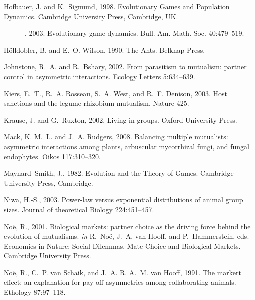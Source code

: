 \documentclass[a4paper]{scrartcl}
\begin{document}
\begin{thebibliography}{58}
Hofbauer, J. and K.~Sigmund, 1998.
\newblock Evolutionary Games and Population Dynamics.
\newblock Cambridge University Press, Cambridge, UK.

---{}---{}---, 2003.
\newblock Evolutionary game dynamics.
\newblock Bull. Am. Math. Soc. 40:479--519.

H{\"o}lldobler, B. and E.~O. Wilson, 1990.
\newblock The Ants.
\newblock Belknap Press.

Johnstone, R.~A. and R.~Bshary, 2002.
\newblock From parasitism to mutualism: partner control in asymmetric
  interactions.
\newblock Ecology Letters 5:634--639.

Kiers, E.~T., R.~A. Rosseau, S.~A. West, and R.~F. Denison, 2003.
\newblock Host sanctions and the legume-rhizobium mutualism.
\newblock Nature 425.

Krause, J. and G.~Ruxton, 2002.
\newblock Living in groups.
\newblock Oxford University Press.

Mack, K. M.~L. and J.~A. Rudgers, 2008.
\newblock Balancing multiple mutualists: asymmetric interactions among plants,
  arbuscular mycorrhizal fungi, and fungal endophytes.
\newblock Oikos 117:310--320.

Maynard~Smith, J., 1982.
\newblock Evolution and the Theory of Games.
\newblock Cambridge University Press, Cambridge.

Niwa, H.-S., 2003.
\newblock Power-law versus exponential distributions of animal group sizes.
\newblock Journal of theoretical Biology 224:451--457.

No{\"e}, R., 2001.
\newblock Biological markets: partner choice as the driving force behind the
  evolution of mutualisms.
\newblock \emph{in} R.~No{\"e}, J.~A. van Hooff, and P.~Hammerstein, eds.
  Economics in Nature: Social Dilemmas, Mate Choice and Biological Markets.
  Cambridge University Press.

No{\"e}, R., C.~P. van Schaik, and J.~A. R. A.~M. van Hooff, 1991.
\newblock The markert effect: an explanation for pay-off asymmetries among
  collaborating animals.
\newblock Ethology 87:97--118.


\end{thebibliography}
\end{document}
